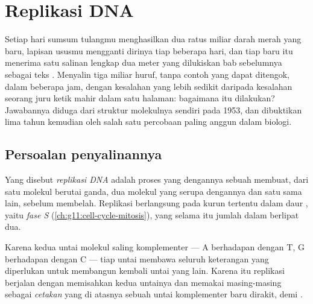 \chapter{Replikasi DNA}\label{ch:g11:dna-replication}

Setiap hari sumsum tulangmu menghasilkan dua ratus miliar  darah
merah yang baru, lapisan ususmu mengganti dirinya tiap beberapa hari,
dan tiap  baru itu menerima satu salinan lengkap dua meter  yang
dilukiskan bab sebelumnya sebagai teks . Menyalin tiga miliar
huruf, tanpa contoh yang dapat ditengok, dalam beberapa jam, dengan
kesalahan yang lebih sedikit daripada kesalahan seorang juru ketik
mahir dalam satu halaman: bagaimana itu dilakukan? Jawabannya diduga
dari struktur molekulnya sendiri pada 1953, dan dibuktikan lima tahun
kemudian oleh salah satu percobaan paling anggun dalam biologi.

\section{Persoalan penyalinannya}

\begin{definition}[Replikasi]\label{def:g11:dna-replication:replication}
Yang disebut \emph{replikasi DNA} adalah proses
yang dengannya sebuah  membuat, dari satu molekul  berutai ganda,
dua molekul yang serupa dengannya dan satu sama lain, sebelum membelah.
Replikasi berlangsung pada kurun tertentu dalam daur , yaitu
\emph{fase S} (\cref{ch:g11:cell-cycle-mitosis}), yang selama itu
jumlah  dalam  berlipat dua.
\end{definition}

\begin{proposition}\label{prop:g11:dna-replication:template}
Karena kedua untai molekul  saling komplementer --- A berhadapan
dengan T, G berhadapan dengan C --- tiap untai membawa seluruh
keterangan yang diperlukan untuk membangun kembali untai yang lain.
Karena itu replikasi berjalan dengan memisahkan kedua untainya dan
memakai masing-masing sebagai \emph{cetakan} yang di atasnya sebuah
untai komplementer baru dirakit,  demi .
\end{proposition}
\admitted

